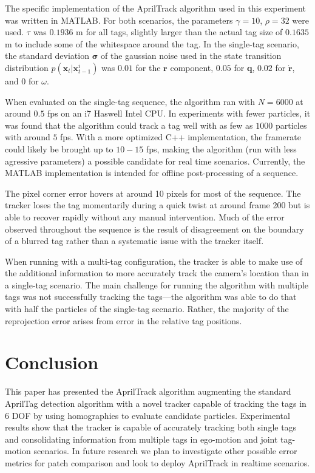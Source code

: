 \documentclass[letterpaper, 10 pt, conference]{ieeeconf}
\renewcommand{\vec}[1]{\boldsymbol{#1}}
\begin{document}
The specific implementation of the AprilTrack algorithm used in this experiment was written in MATLAB. For both scenarios, the parameters $\gamma = 10$, $\rho=32$ were used. $\tau$ was $0.1936$ m for all tags, slightly larger than the actual tag size of $0.1635$ m to include some of the whitespace around the tag. In the single-tag scenario, the standard deviation $\vec{\sigma}$  of the gaussian noise used in the state transition distribution $p(\vec{x}_t|\vec{x}^i_{t-1})$ was $0.01$ for the $\vec{r}$ component, $0.05$ for $\vec{q}$, $0.02$ for $\dot{\vec{r}}$, and $0$ for $\omega$.


When evaluated on the single-tag sequence, the algorithm ran with $N=6000$ at around $0.5$ fps on an i7 Haswell Intel CPU. In experiments with fewer particles, it was found that the algorithm could track a tag well with as few as $1000$ particles with around $5$ fps. With a more optimized C++ implementation, the framerate could likely be brought up to $10-15$ fps, making the algorithm (run with less agressive parameters) a possible candidate for real time scenarios. Currently, the MATLAB implementation is intended for offline post-processing of a sequence.


The pixel corner error hovers at around 10 pixels for most of the sequence. The tracker loses the tag momentarily during a quick twist at around frame 200 but is able to recover rapidly without any manual intervention. Much of the error observed throughout the sequence is the result of disagreement on the boundary of a blurred tag rather than a systematic issue with the tracker itself.

When running with a multi-tag configuration, the tracker is able to make use of the additional information to more accurately track the camera's location than in a single-tag scenario. The main challenge for running the algorithm with multiple tags was not successfully tracking the tags---the algorithm was able to do that with half the particles of the single-tag scenario. Rather, the majority of the reprojection error arises from error in the relative tag positions.

\section{Conclusion}

This paper has presented the AprilTrack algorithm augmenting the standard AprilTag detection algorithm with a novel tracker capable of tracking the tags in 6 DOF by using homographies to evaluate candidate particles. Experimental results show that the tracker is capable of accurately tracking both single tags and consolidating information from multiple tags in ego-motion and joint tag-motion scenarios. In future research we plan to investigate other possible error metrics for patch comparison and look to deploy AprilTrack in realtime scenarios.
\end{document}
